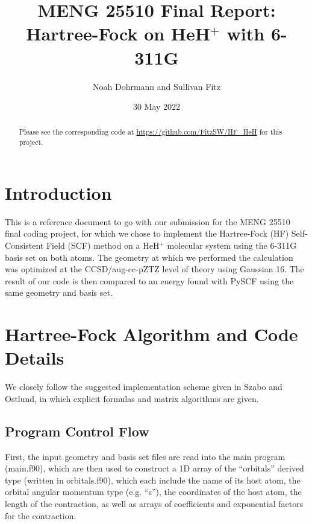 \documentclass[%
 aip,
 amsmath,amssymb,
 reprint,%
]{revtex4-1}
\begin{document}

\title[MENG 25510 Final]{MENG 25510 Final Report:\\ Hartree-Fock on
HeH$^{+}$ with 6-311G}
\author{Noah Dohrmann and Sullivan Fitz}


\date{30 May 2022}%

\begin{abstract}
Please see the corresponding code at \url{https://github.com/FitzSW/HF_HeH}
for this project.
\end{abstract}

\maketitle

\section{Introduction}
This is a reference document to go with our submission for the MENG 25510
final coding project, for which we chose to implement the Hartree-Fock (HF)
Self-Consistent Field (SCF) method on a HeH$^{+}$ molecular system using the
6-311G basis set on both atoms. The geometry at which we performed the
calculation was optimized at the CCSD/aug-cc-pZTZ level of theory using
Gaussian 16\cite{g16}. The result of our code is then compared to an energy
found with
PySCF\cite{sun2020recent,https://doi.org/10.1002/wcms.1340,https://doi.org/10.1002/jcc.23981}
using the same geometry and basis set.

\section{Hartree-Fock Algorithm and Code Details}
We closely follow the suggested implementation scheme given in Szabo and
Ostlund\cite{szabo2012modern}, in which explicit formulas and matrix
algorithms are given.  

\subsection{Program Control Flow} 
First, the input geometry and basis set files are read into the main program
({\code main.f90}), which are then used to construct a 1D array of the
``orbitals'' derived type (written in {\code orbitals.f90}), which each include
the name of its host atom, the orbital angular momentum type (e.g. ``s''), the
coordinates of the host atom, the length of the contraction, as well as arrays
of coefficients and exponential factors for the contraction.
\end{document}
